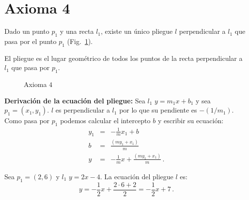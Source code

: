 

\section{Axioma 4}\label{s.ax4}

\begin{axiom}
Dado un punto $p_1$ y una recta $l_1$, existe un único pliegue $l$ perpendicular a $l_1$ que pasa por el punto $p_1$ (Fig.~\ref{f.origami-axiom4}).
\end{axiom}

El pliegue es el lugar geométrico de todos los puntos de la recta perpendicular a $l_1$ que pasa por $p_1$.

\begin{figure}[ht]
\begin{center}
\end{center}
\caption{Axioma $4$}\label{f.origami-axiom4}
\end{figure}

\noindent\textbf{Derivación de la ecuación del pliegue:}
Sea $l_1$ $y = m_1x + b_1$ y sea $p_1=(x_1,y_1)$. $l$ es perpendicular a $l_1$ por lo que su pendiente es $-(1/m_1)$. Como pasa por $p_1$ podemos calcular el intercepto $b$ y escribir su ecuación:
\begin{eqnarray*}
y_1&=&-\frac{1}{m} x_1 + b\\
b&=& \frac{(my_1+x_1)}{m}\\
y&=&-\frac{1}{m} x +\frac{(my_1+x_1)}{m}\,.
\end{eqnarray*}
\begin{example}
Sea $p_1=(2,6)$ y $l_1$ $y=2x-4$. La ecuación del pliegue $l$ es:
\[
y=-\frac{1}{2}x + \frac{2\cdot 6 + 2}{2}=-\frac{1}{2}x + 7\,.
\]
\end{example}

